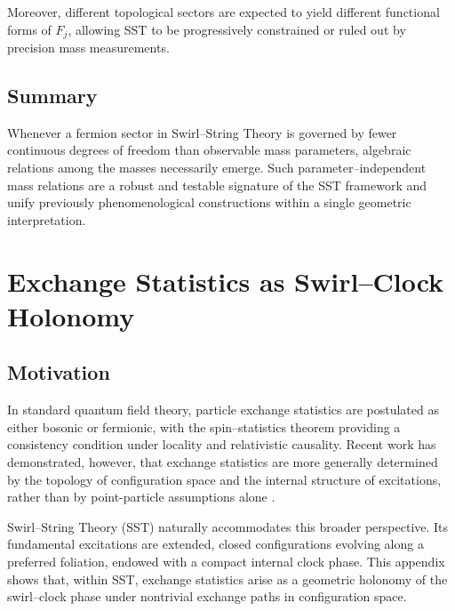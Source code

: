 \documentclass[11pt]{article}
\begin{document}
        Moreover, different topological sectors are expected to yield different
        functional forms of $F_j$, allowing SST to be progressively constrained or
        ruled out by precision mass measurements.

    \subsection{Summary}

        Whenever a fermion sector in Swirl--String Theory is governed by fewer continuous
        degrees of freedom than observable mass parameters, algebraic relations among
        the masses necessarily emerge.
        Such parameter--independent mass relations are a robust and testable signature
        of the SST framework and unify previously phenomenological constructions within
        a single geometric interpretation.


    \section{Exchange Statistics as Swirl--Clock Holonomy}
        \label{app:exchange_statistics}

        \subsection{Motivation}

            In standard quantum field theory, particle exchange statistics are postulated as
            either bosonic or fermionic, with the spin--statistics theorem providing a
            consistency condition under locality and relativistic causality.
            Recent work has demonstrated, however, that exchange statistics are more
            generally determined by the topology of configuration space and the internal
            structure of excitations, rather than by point-particle assumptions alone
            \cite{BeyondFermions2023}.

            Swirl--String Theory (SST) naturally accommodates this broader perspective.
            Its fundamental excitations are extended, closed configurations evolving along
            a preferred foliation, endowed with a compact internal clock phase.
            This appendix shows that, within SST, exchange statistics arise as a geometric
            holonomy of the swirl--clock phase under nontrivial exchange paths in
            configuration space.
\end{document}
